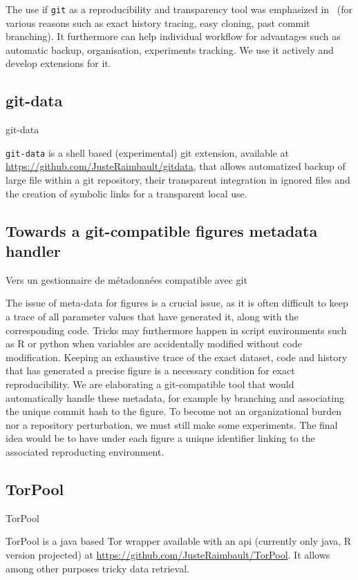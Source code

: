 The use if \texttt{git} as a reproducibility and transparency tool was emphasized in~\cite{ram2013git} (for various reasons such as exact history tracing, easy cloning, past commit branching). It furthermore can help individual workflow for advantages such as automatic backup, organisation, experiments tracking. We use it actively and develop extensions for it.


\subsection{git-data}{git-data}

\texttt{git-data} is a shell based (experimental) git extension, available at \url{https://github.com/JusteRaimbault/gitdata}, that allows automatized backup of large file within a git repository, their transparent integration in ignored files and the creation of symbolic links for a transparent local use.


\subsection{Towards a git-compatible figures metadata handler}{Vers un gestionnaire de métadonnées compatible avec git}

The issue of meta-data for figures is a crucial issue, as it is often difficult to keep a trace of all parameter values that have generated it, along with the corresponding code. Tricks may furthermore happen in script environments such as R or python when variables are accidentally modified without code modification. Keeping an exhaustive trace of the exact dataset, code and history that has generated a precise figure is a necessary condition for exact reproducibility. We are elaborating a git-compatible tool that would automatically handle these metadata, for example by branching and associating the unique commit hash to the figure. To become not an organizational burden nor a repository perturbation, we must still make some experiments. The final idea would be to have under each figure a unique identifier linking to the associated reproducting environment.


\subsection{TorPool}{TorPool}

TorPool is a java based Tor wrapper available with an api (currently only java, R version projected) at \url{https://github.com/JusteRaimbault/TorPool}. It allows among other purposes tricky data retrieval.

